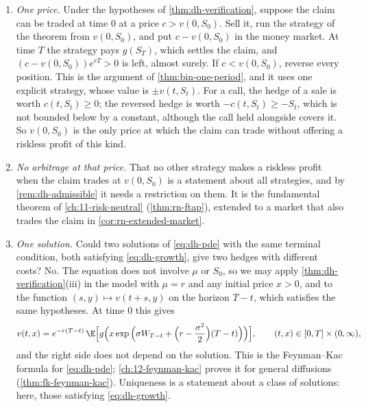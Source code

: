 \begin{remark}\label{rem:dh-price}
\begin{enumerate}[label=(\alph*),leftmargin=*]
  \item \emph{One price.} Under the hypotheses of \cref{thm:dh-verification}, suppose the
    claim can be traded at time $0$ at a price $c>v(0,S_0)$. Sell it, run the strategy of
    the theorem from $v(0,S_0)$, and put $c-v(0,S_0)$ in the money market. At time $T$ the
    strategy pays $g(S_T)$, which settles the claim, and $(c-v(0,S_0))e^{rT}>0$ is left, almost
    surely. If $c<v(0,S_0)$, reverse every position. This is the argument of
    \cref{thm:bin-one-period}, and it uses one explicit strategy, whose value is $\pm v(t,S_t)$.
    For a call, the hedge of a sale is worth $c(t,S_t)\ge0$; the reversed hedge is worth
    $-c(t,S_t)\ge-S_t$, which is not bounded below by a constant, although the call held
    alongside covers it. So $v(0,S_0)$ is the only price at which the claim can trade
    without offering a riskless profit of this kind.
  \item \emph{No arbitrage at that price.} That no other strategy makes a riskless profit when
    the claim trades at $v(0,S_0)$ is a statement about all strategies, and by
    \cref{rem:dh-admissible} it needs a restriction on them. It is the fundamental theorem
    of \cref{ch:11-risk-neutral} (\cref{thm:rn-ftap}), extended to a market that
    also trades the claim in \cref{cor:rn-extended-market}.
  \item \emph{One solution.} Could two solutions of \eqref{eq:dh-pde} with the same terminal
    condition, both satisfying \eqref{eq:dh-growth}, give two hedges with different costs? No.
    The equation does not involve $\mu$ or $S_0$, so we may apply
    \cref{thm:dh-verification}(iii) in the model with $\mu=r$ and any initial price $x>0$, and
    to the function $(s,y)\mapsto v(t+s,y)$ on the horizon $T-t$, which satisfies the same
    hypotheses. At time $0$ this gives
    \begin{equation}\label{eq:dh-feynman-kac}
      v(t,x)=e^{-r(T-t)}\,\E\Big[g\Big(x\exp\Big(\sigma W_{T-t}+\Big(r-\frac{\sigma^2}{2}\Big)(T-t)\Big)\Big)\Big],
      \qquad(t,x)\in[0,T]\times(0,\infty),
    \end{equation}
    and the right side does not depend on the solution. This is the Feynman--Kac formula for
    \eqref{eq:dh-pde}; \cref{ch:12-feynman-kac} proves it for general diffusions
    (\cref{thm:fk-feynman-kac}). Uniqueness is a statement about a class of solutions: here,
    those satisfying \eqref{eq:dh-growth}.
\end{enumerate}
\end{remark}

